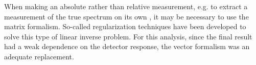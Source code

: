 When making an absolute rather than relative measurement,
e.g. to extract a measurement of the true \nuebar{} spectrum on its own
\cite{reactorflux2017},
it may be necessary to use the matrix formalism.
So-called regularization techniques have been developed
to solve this type of linear inverse problem.
For this analysis, since the final result
had a weak dependence on the detector response,
the vector formalism was an adequate replacement.
